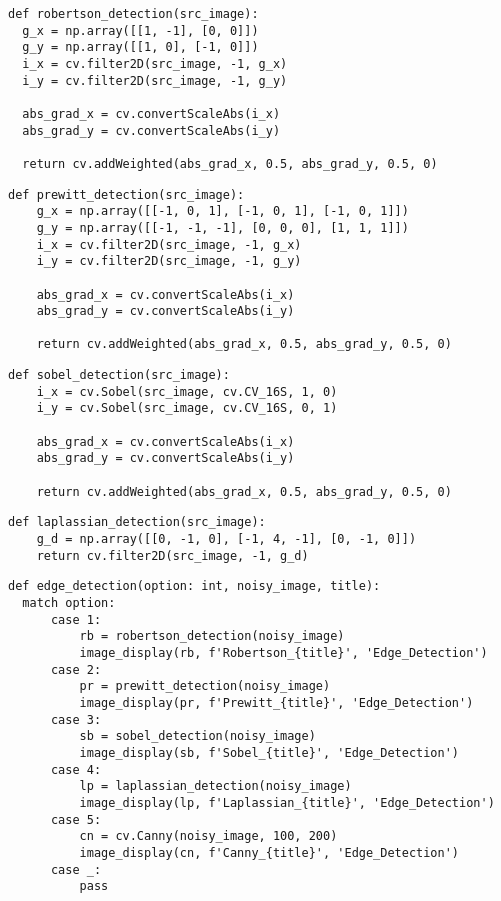 \documentclass[a4paper, 12pt]{extarticle}
\begin{document}
\begin{lstlisting}[style=python_white]
def robertson_detection(src_image):
  g_x = np.array([[1, -1], [0, 0]])
  g_y = np.array([[1, 0], [-1, 0]])
  i_x = cv.filter2D(src_image, -1, g_x)
  i_y = cv.filter2D(src_image, -1, g_y)

  abs_grad_x = cv.convertScaleAbs(i_x)
  abs_grad_y = cv.convertScaleAbs(i_y)

  return cv.addWeighted(abs_grad_x, 0.5, abs_grad_y, 0.5, 0)
\end{lstlisting}

\begin{lstlisting}[style=python_white]
def prewitt_detection(src_image):
    g_x = np.array([[-1, 0, 1], [-1, 0, 1], [-1, 0, 1]])
    g_y = np.array([[-1, -1, -1], [0, 0, 0], [1, 1, 1]])
    i_x = cv.filter2D(src_image, -1, g_x)
    i_y = cv.filter2D(src_image, -1, g_y)

    abs_grad_x = cv.convertScaleAbs(i_x)
    abs_grad_y = cv.convertScaleAbs(i_y)

    return cv.addWeighted(abs_grad_x, 0.5, abs_grad_y, 0.5, 0)
\end{lstlisting}

\begin{lstlisting}[style=python_white]
def sobel_detection(src_image):
    i_x = cv.Sobel(src_image, cv.CV_16S, 1, 0)
    i_y = cv.Sobel(src_image, cv.CV_16S, 0, 1)

    abs_grad_x = cv.convertScaleAbs(i_x)
    abs_grad_y = cv.convertScaleAbs(i_y)

    return cv.addWeighted(abs_grad_x, 0.5, abs_grad_y, 0.5, 0)
\end{lstlisting}

\begin{lstlisting}[style=python_white]
def laplassian_detection(src_image):
    g_d = np.array([[0, -1, 0], [-1, 4, -1], [0, -1, 0]])
    return cv.filter2D(src_image, -1, g_d)
\end{lstlisting}

\begin{lstlisting}[style=python_white]
def edge_detection(option: int, noisy_image, title):
  match option:
      case 1:
          rb = robertson_detection(noisy_image)
          image_display(rb, f'Robertson_{title}', 'Edge_Detection')
      case 2:
          pr = prewitt_detection(noisy_image)
          image_display(pr, f'Prewitt_{title}', 'Edge_Detection')
      case 3:
          sb = sobel_detection(noisy_image)
          image_display(sb, f'Sobel_{title}', 'Edge_Detection')
      case 4:
          lp = laplassian_detection(noisy_image)
          image_display(lp, f'Laplassian_{title}', 'Edge_Detection')
      case 5:
          cn = cv.Canny(noisy_image, 100, 200)
          image_display(cn, f'Canny_{title}', 'Edge_Detection')
      case _:
          pass
\end{lstlisting}
\end{document}
